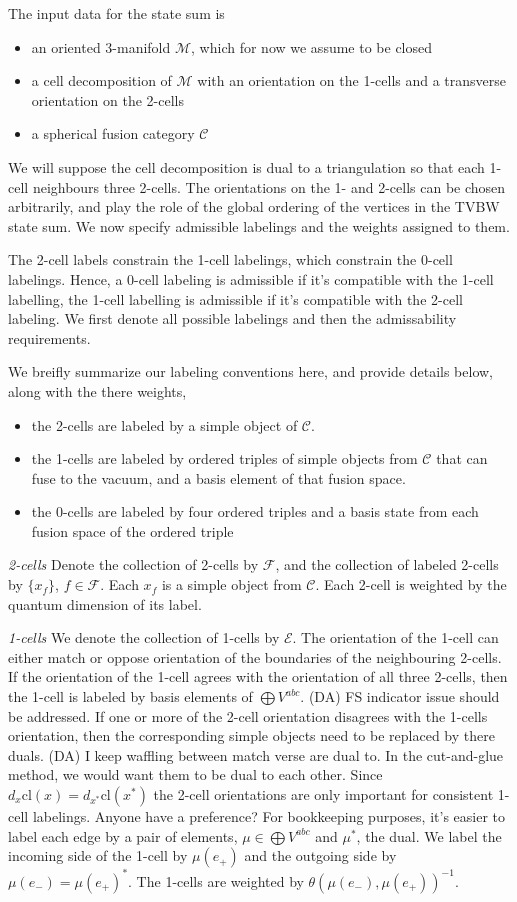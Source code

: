 \documentclass[12pt,a4paper]{article}
\newcommand{\mce}{\mathcal{E}}
\newcommand{\mcc}{\mathcal{C}}
\newcommand{\mcm}{\mathcal{M}}
\newcommand{\mcf}{\mathcal{F}}
\newcommand{\dave}[1]{{\color{ao(english)}\footnotesize{(DA) #1}}}
\begin{document}
The input data for the state sum is
\begin{itemize}
\item an oriented 3-manifold $\mcm$, which for now we assume to be closed
\item a cell decomposition of $\mcm$ with an orientation on the 1-cells and a transverse orientation on the 2-cells
\item a spherical fusion category $\mcc$ 
\end{itemize}
We will suppose the cell decomposition is dual to a triangulation so that each 1-cell neighbours three 2-cells.
The orientations on the 1- and 2-cells can be chosen arbitrarily, 
and play the role of the global ordering of the vertices in the TVBW state sum. 
We now specify admissible labelings and the weights assigned to them.


The 2-cell labels constrain the 1-cell labelings, which constrain the 0-cell labelings.
Hence, a 0-cell labeling is admissible if it's compatible with the 1-cell labelling, 
the 1-cell labelling is admissible if it's compatible with the 2-cell labeling. 
We first denote all possible labelings and then the admissability requirements.

We breifly summarize our labeling conventions here, 
and provide details below, along with the there weights,
\begin{itemize}
\item the 2-cells are labeled by a simple object of $\mcc$.
\item the 1-cells are labeled by ordered triples of simple objects from $\mcc$ that can fuse to the vacuum, 
and a basis element of that fusion space.
\item the 0-cells are labeled by four ordered triples and a basis state from each fusion space of the ordered triple
\end{itemize}

{\it 2-cells}
Denote the collection of 2-cells by $\mcf$, 
and the collection of labeled 2-cells by $\{ x_f \}$, $f \in \mcf$.
Each $x_f$ is a simple object from $\mcc$.
Each 2-cell is weighted by the quantum dimension of its label. 

{\it 1-cells}
We denote the collection of 1-cells by $\mce$.
The orientation of the 1-cell can either match or oppose orientation of the boundaries of the neighbouring 2-cells. 
If the orientation of the 1-cell agrees with the orientation of all three 2-cells, 
then the 1-cell is labeled by basis elements of $\bigoplus V^{abc}$.
\dave{FS indicator issue should be addressed. }
If one or more of the 2-cell orientation disagrees with the 1-cells orientation, 
then the corresponding simple objects need to be replaced by there duals.
\dave{I keep waffling between match verse are dual to. 
In the cut-and-glue method, we would want them to be dual to each other.
Since $d_x \text{cl}(x) = d_{x^*} \text{cl}(x^*)$ the 2-cell orientations are only important for consistent 1-cell labelings.
Anyone have a preference?}
For bookkeeping purposes, it's easier to label each edge by a pair of elements, $\mu \in  \bigoplus V^{abc}$ and $\mu^*$, the dual. 
We label the incoming side of the 1-cell by $\mu(e_+)$ and the outgoing side by $\mu(e_-) = \mu(e_+)^*$.
The 1-cells are weighted by $\theta(\mu(e_-),\mu(e_+))^{-1}$.
\end{document}
